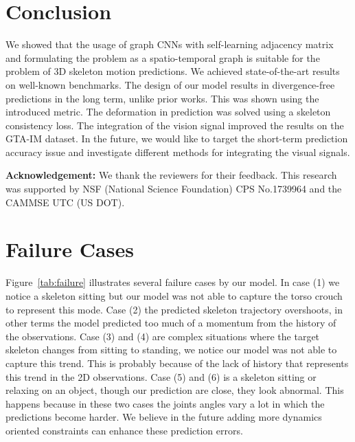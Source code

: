 \documentclass[10pt,twocolumn,letterpaper]{article}
\begin{document}
\section{Conclusion}
We showed that the usage of graph CNNs with self-learning adjacency matrix and formulating the problem as a spatio-temporal graph is suitable for the problem of 3D skeleton motion predictions. We achieved state-of-the-art results on well-known benchmarks. The design of our model results in divergence-free predictions in the long term, unlike prior works. This was shown using the introduced  metric. The deformation in prediction was solved using a skeleton consistency loss. The integration of the vision signal improved the results on the GTA-IM dataset. In the future, we would like to target the short-term prediction accuracy issue and investigate different methods for integrating the visual signals.

\textbf{Acknowledgement:} We thank the reviewers for their feedback. This research was supported by NSF (National Science Foundation) CPS No.1739964 and the CAMMSE UTC (US DOT).
\clearpage
{\small


}
\clearpage
\appendix

\section{Failure Cases}

Figure~\ref{tab:failure} illustrates several failure cases by our model. In case (1) we notice a skeleton sitting but our model was not able to capture the torso crouch to represent this mode. Case (2) the predicted skeleton trajectory overshoots, in other terms the model predicted too much of a momentum from the history of the observations. Case (3) and (4) are complex situations where the target skeleton changes from sitting to standing, we notice our model was not able to capture this trend. This is probably because of the lack of history that represents this trend in the 2D observations. Case (5) and (6) is a skeleton sitting or relaxing on an object, though our prediction are close, they look abnormal. This happens because in these two cases the joints angles vary a lot in which the predictions become harder. We believe in the future adding more dynamics oriented constraints can enhance these prediction errors.
\end{document}
